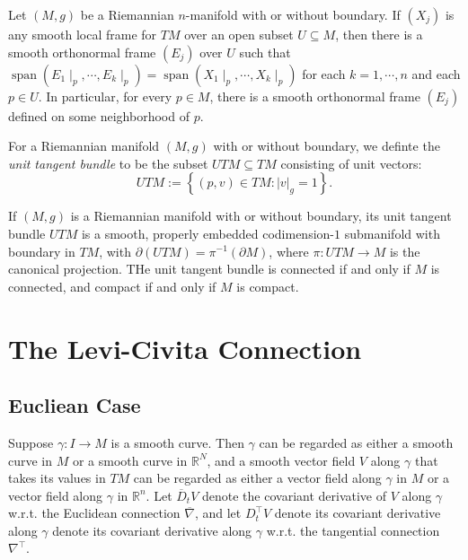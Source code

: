 \begin{proposition}
  \label{proposition-exitence-of-orthonormal-frames}
  Let \( (M, g) \) be a Riemannian \( n \)-manifold with or without boundary.
  If \( (X_j) \) is any smooth local frame for \( TM \) over an open subset \( U \subseteq M \), then there is a smooth orthonormal frame \( (E_j) \) over \( U \) such that \( \operatorname{span}(E_1 \mid_p, \cdots, E_k \mid_p) = \operatorname{span}(X_1 \mid_p, \cdots, X_k \mid_p) \) for each \( k = 1, \cdots, n \) and each \( p \in U \).
  In particular, for every \( p \in M \), there is a smooth orthonormal frame \( (E_j) \) defined on some neighborhood of \( p \).
\end{proposition}

\begin{definition}
  \label{definition-unit-tangent-bundle}
  For a Riemannian manifold \( (M, g) \) with or without boundary, we definte the \emph{unit tangent bundle} to be the subset \( UTM \subseteq TM \) consisting of unit vectors:
  \[
    UTM := \left\lbrace (p, v) \in TM: \left\lvert v \right\rvert_g = 1 \right\rbrace.
  \]
\end{definition}

\begin{proposition}
  \label{proposition-properties-unit-tangent-bundle}
  If \( (M, g) \) is a Riemannian manifold with or without boundary, its unit tangent bundle \( UTM \) is a smooth, properly embedded codimension-\( 1 \) submanifold with boundary in \( TM \), with \( \partial(UTM) = \pi^{-1}(\partial M) \), where \( \pi: UTM \to M \) is the canonical projection.
  THe unit tangent bundle is connected if and only if \( M \) is connected, and compact if and only if \( M \) is compact.
\end{proposition}

\section{The Levi-Civita Connection}
\label{section-the-Levi-Civita-connection}

\subsection{Eucliean Case}
\label{subsection-Eucliean-LV-connection}

Suppose \( \gamma: I \to M \) is a smooth curve.
Then \( \gamma \) can be regarded as either a smooth curve in \( M \) or a smooth curve in \( \mathbb{R}^N \), and a smooth vector field \( V \) along \( \gamma \) that takes its values in \( TM \) can be regarded as either a vector field along \( \gamma \) in \( M \) or a vector field along \( \gamma \) in \( \mathbb{R}^n \).
Let \( \overline{D}_t V \) denote the covariant derivative of \( V \) along \( \gamma \) w.r.t. the Euclidean connection \( \overline{\nabla} \), and let \( D^{\top}_t V \) denote its covariant derivative along \( \gamma \) denote its covariant derivative along \( \gamma \) w.r.t. the tangential connection \( \nabla^{\top} \).

